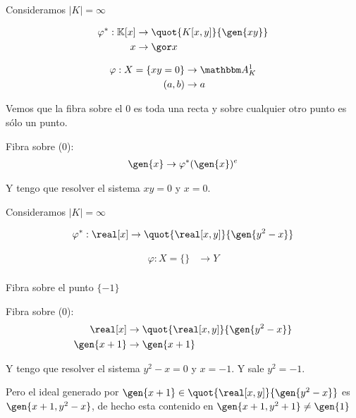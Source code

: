 \begin{example}
	Consideramos $|K| = \infty$
	
	\begin{align*}
		\varphi^*: \K[x]& \rightarrow \quot{K[x,y]}{\gen{xy}} \\
		x & \rightarrow \cls{x}
	\end{align*}
	
	\begin{align*}
		\varphi: X=\{ xy=0  \} & \rightarrow \A^1_K \\
		(a,b) & \rightarrow a
	\end{align*}
	
	Vemos que la fibra sobre el $0$ es toda una recta  y sobre cualquier otro punto es sólo un punto.
	
	Fibra sobre (0):
	\begin{align*}
		\gen{x} & \rightarrow \varphi^*(\gen{x})^e \\
	\end{align*}
	
	Y tengo que resolver el sistema $xy=0$ y $x=0$.
\end{example}

\begin{example}
	Consideramos $|K| = \infty$
	
	\begin{align*}
		\varphi^*: \real[x]& \rightarrow \quot{\real[x,y]}{\gen{y^2-x}} \\
	\end{align*}
	
	\begin{align*}
		\varphi: X=\{ \} & \rightarrow Y \\
	\end{align*}
	
	Fibra sobre el punto $\{-1\}$
	
	Fibra sobre (0):
	\begin{align*}
		\real[x]& \rightarrow \quot{\real[x,y]}{\gen{y^2-x}} \\
		\gen{x+1} & \rightarrow \gen{x+1}
	\end{align*}
	
	Y tengo que resolver el sistema $y^2-x=0$ y $x=-1$. Y sale $y^2=-1$.
	
	Pero el ideal generado por $\gen{x+1} \in \quot{\real[x,y]}{\gen{y^2-x}}$ es $\gen{x+1, y^2-x}$, de hecho esta contenido en $\gen{x+1, y^2+1}\neq \gen{1}$
\end{example}

